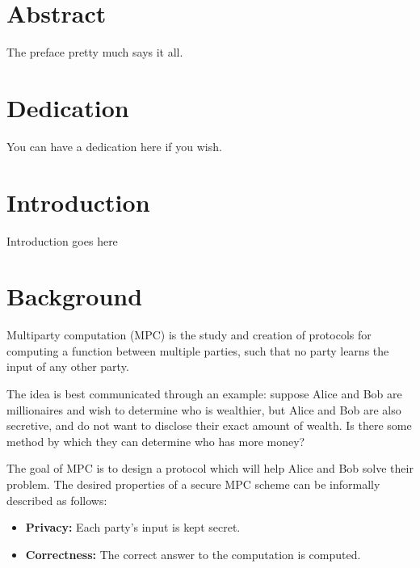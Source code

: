 \documentclass[12pt,twoside]{reedthesis}
\begin{document}
    \tableofcontents
    \listoftables
    \listoffigures

    \chapter*{Abstract}
	The preface pretty much says it all.
	
	\chapter*{Dedication}
	You can have a dedication here if you wish.

  \mainmatter %
  \pagestyle{fancyplain} %


\chapter*{Introduction}
\doublespacing

 Introduction goes here

\chapter{Background}

Multiparty computation (MPC) is the study and creation of protocols for computing a function between multiple parties, such that no party learns the input of any other party.

The idea is best communicated through an example: suppose Alice and Bob are millionaires and wish to determine who is wealthier, but Alice and Bob are also secretive, and do not want to disclose their exact amount of wealth. 
Is there some method by which they can determine who has more money?

The goal of MPC is to design a protocol which will help Alice and Bob solve their problem.
The desired properties of a secure MPC scheme can be informally described as follows:
\begin{itemize}
    \item \textbf{Privacy:} Each party's input is kept secret.
    \item \textbf{Correctness:} The correct answer to the computation is computed.
\end{itemize}
\end{document}

